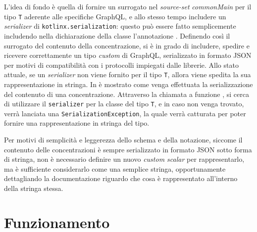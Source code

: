 L'idea di fondo è quella di fornire un surrogato nel \textit{source-set} \textit{commonMain} per il tipo \texttt{T} aderente alle specifiche GraphQL, e allo
stesso tempo includere un \textit{serializer} di \texttt{kotlinx.serialization}: questo può essere fatto semplicemente includendo nella
dichiarazione della classe l'annotazione . Definendo così il surrogato del contenuto della concentrazione, si è in grado di
includere, spedire e ricevere correttamente un tipo \textit{custom} di GraphQL, serializzato in formato JSON per motivi di compatibilità con i protocolli
impiegati dalle librerie. Allo stato attuale, se un \textit{serializer} non viene fornito per il tipo \texttt{T}, allora viene spedita la sua rappresentazione
in stringa. In  è mostrato come venga effettuata la serializzazione del contenuto di una concentrazione.
%
%
Attraverso la chiamata a funzione , si cerca di utilizzare il \texttt{serializer} per la classe del tipo \texttt{T},
e in caso non venga trovato, verrà lanciata una \texttt{SerializationException}, la quale verrà catturata per poter fornire una rappresentazione in stringa
del tipo.

Per motivi di semplicità e leggerezza dello schema e della notazione, siccome il contenuto delle concentrazioni è sempre serializzato in formato JSON sotto forma di stringa,
non è necessario definire un nuovo \textit{custom scalar} per rappresentarlo, ma è sufficiente considerarlo come una semplice stringa, opportunamente dettagliando la
documentazione riguardo che cosa è rappresentato all'interno della stringa stessa.

\section{Funzionamento}\label{sec:functioning}
